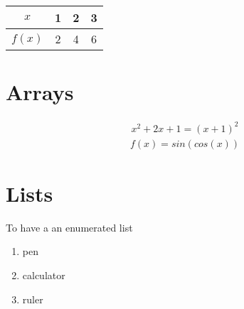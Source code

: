 \documentclass[12pt]{article}
\begin{document}
\begin{tabular}{|c|c|c|c|} %
    \hline
    $x$&1&2&3 \\ \hline
    $f(x)$&2&4&6 \\ \hline
    
\end{tabular}

\maketitle
\section{Arrays}
\begin{align}
x^2+2x+1=(x+1)^2
\end{align}
\begin{align}
f(x)=sin(cos(x))
\end{align}


\maketitle
\section{Lists}
To have a an enumerated list
\begin{enumerate}
\item pen
\item calculator
\item ruler
\end{enumerate}
\end{document}
